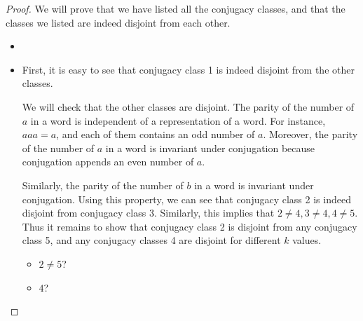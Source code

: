 \documentclass[12pt, psamsfonts]{amsart}
\theoremstyle{definition}
\theoremstyle{remark}
\numberwithin{equation}{section}
\begin{document}
\begin{proof}
  We will prove that we have listed all the conjugacy classes, and that the classes we listed are indeed disjoint from each other.
  \begin{itemize}
    \item
    \item
      First, it is easy to see that conjugacy class 1 is indeed disjoint from the other classes.

      We will check that the other classes are disjoint.
      The parity of the number of $a$ in a word is independent of a representation of a word.
      For instance, $aaa = a$, and each of them contains an odd number of $a$.
      Moreover, the parity of the number of $a$ in a word is invariant under conjugation because conjugation appends an even number of $a$.

      Similarly, the parity of the number of $b$ in a word is invariant under conjugation.
      Using this property, we can see that conjugacy class 2 is indeed disjoint from conjugacy class 3.
      Similarly, this implies that $2 \ne 4, 3 \ne 4, 4 \ne 5$.
      Thus it remains to show that conjugacy class 2 is disjoint from any conjugacy class 5, and any conjugacy classes 4 are disjoint for different $k$ values.
      \begin{itemize}
        \item
          $2 \ne 5$?
          \todo[inline]{
          }
        \item
          $4$?
          \todo[inline]{
          }
      \end{itemize}
  \end{itemize}
\end{proof}
\end{document}
